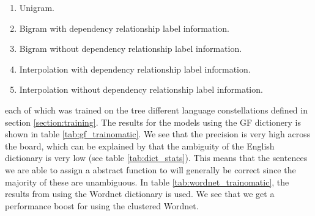 \begin{enumerate}
    \item Unigram.
    \item Bigram with dependency relationship label information.
    \item Bigram without dependency relationship label information.
    \item Interpolation with dependency relationship label information.
    \item Interpolation without dependency relationship label information.
\end{enumerate}
each of which was trained on the tree different language constellations defined in section \ref{section:training}. The results for the models using the GF dictionery is shown in table \ref{tab:gf_trainomatic}. We see that the precision is very high across the board, which can be explained by that the ambiguity of the English dictionary is very low (see table \ref{tab:dict_stats}). This means that the sentences we are able to assign a abstract function to will generally be correct since the majority of these are unambiguous. In table \ref{tab:wordnet_trainomatic}, the results from using the Wordnet dictionary is used. We see that we get a performance boost for using the clustered Wordnet. 
